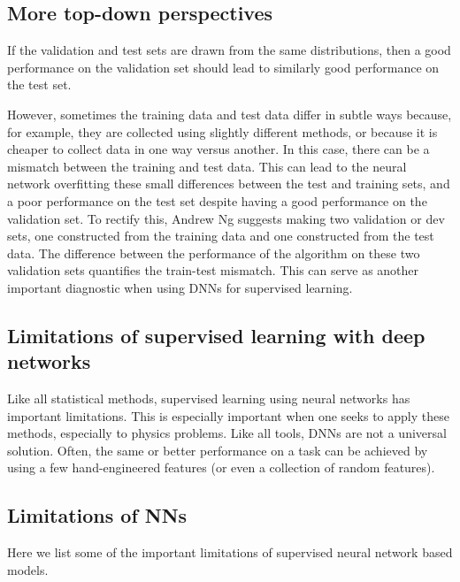 \documentclass[%
oneside,                 %
final,                   %
10pt]{article}
\begin{document}
\noindent
\subsection{More top-down perspectives}

If the validation and test sets are drawn from the same distributions,
then a good performance on the validation set should lead to similarly
good performance on the test set. 

However, sometimes
the training data and test data differ in subtle ways because, for
example, they are collected using slightly different methods, or
because it is cheaper to collect data in one way versus another. In
this case, there can be a mismatch between the training and test
data. This can lead to the neural network overfitting these small
differences between the test and training sets, and a poor performance
on the test set despite having a good performance on the validation
set. To rectify this, Andrew Ng suggests making two validation or dev
sets, one constructed from the training data and one constructed from
the test data. The difference between the performance of the algorithm
on these two validation sets quantifies the train-test mismatch. This
can serve as another important diagnostic when using DNNs for
supervised learning.

\subsection{Limitations of supervised learning with deep networks}

Like all statistical methods, supervised learning using neural
networks has important limitations. This is especially important when
one seeks to apply these methods, especially to physics problems. Like
all tools, DNNs are not a universal solution. Often, the same or
better performance on a task can be achieved by using a few
hand-engineered features (or even a collection of random
features). 

\subsection{Limitations of NNs}

Here we list some of the important limitations of supervised neural network based models. 
\end{document}
